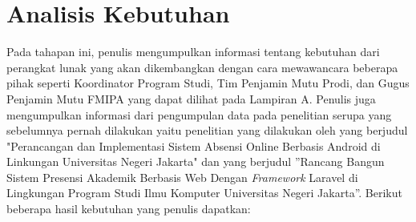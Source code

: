\section{Analisis Kebutuhan }
Pada tahapan ini, penulis mengumpulkan informasi tentang kebutuhan dari perangkat lunak yang akan dikembangkan dengan cara mewawancara beberapa pihak seperti Koordinator Program Studi, Tim Penjamin Mutu Prodi, dan Gugus Penjamin Mutu FMIPA yang dapat dilihat pada Lampiran A. Penulis juga mengumpulkan informasi dari pengumpulan data pada penelitian serupa yang sebelumnya pernah dilakukan yaitu penelitian yang dilakukan oleh \cite{FitriAndiniMedIrzal2017} yang berjudul "Perancangan dan Implementasi Sistem Absensi Online Berbasis Android di Linkungan Universitas Negeri Jakarta"  dan \cite{Kultsum2021} yang berjudul ''Rancang Bangun Sistem Presensi Akademik Berbasis Web Dengan \textit{Framework} Laravel di Lingkungan Program Studi Ilmu Komputer Universitas Negeri Jakarta''. Berikut beberapa hasil kebutuhan yang penulis dapatkan:

